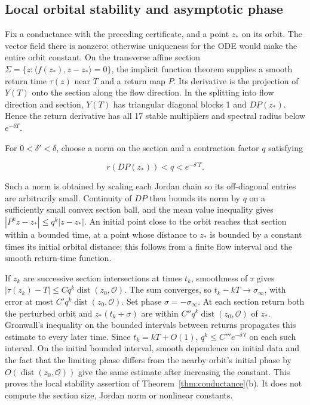 \documentclass[11pt]{article}
\theoremstyle{definition}
\begin{document}
\subsection{Local orbital stability and asymptotic phase}\label{sec:cg-10}

Fix a conductance with the preceding certificate, and a point $z_*$ on its orbit. The vector field there is nonzero: otherwise uniqueness for the ODE would make the entire orbit constant. On the transverse affine section $\Sigma=\{z:\langle f(z_*),z-z_*\rangle=0\}$, the implicit function theorem supplies a smooth return time $\tau(z)$ near $T$ and a return map $P$. Its derivative is the projection of $Y(T)$ onto the section along the flow direction. In the splitting into flow direction and section, $Y(T)$ has triangular diagonal blocks 1 and $DP(z_*)$. Hence the return derivative has all 17 stable multipliers and spectral radius below $e^{-\delta T}$.

For $0<\delta'<\delta$, choose a norm on the section and a contraction factor $q$ satisfying

\[
 r(DP(z_*))<q<e^{-\delta'T}.
\]

Such a norm is obtained by scaling each Jordan chain so its off-diagonal entries are arbitrarily small. Continuity of $DP$ then bounds its norm by $q$ on a sufficiently small convex section ball, and the mean value inequality gives $|P^kz-z_*|\le q^k|z-z_*|$. An initial point close to the orbit reaches that section within a bounded time, at a point whose distance to $z_*$ is bounded by a constant times its initial orbital distance; this follows from a finite flow interval and the smooth return-time function.

If $z_k$ are successive section intersections at times $t_k$, smoothness of $\tau$ gives $|\tau(z_k)-T|\le Cq^k\operatorname{dist}(z_0,\mathcal O)$. The sum converges, so $t_k-kT\to\sigma_\infty$, with error at most $C'q^k\operatorname{dist}(z_0,\mathcal O)$. Set phase $\sigma=-\sigma_\infty$. At each section return both the perturbed orbit and $z_*(t_k+\sigma)$ are within $C''q^k\operatorname{dist}(z_0,\mathcal O)$ of $z_*$. Gronwall's inequality on the bounded intervals between returns propagates this estimate to every later time. Since $t_k=kT+O(1)$, $q^k\le C'''e^{-\delta't}$ on each such interval. On the initial bounded interval, smooth dependence on initial data and the fact that the limiting phase differs from the nearby orbit's initial phase by $O(\operatorname{dist}(z_0,\mathcal O))$ give the same estimate after increasing the constant. This proves the local stability assertion of Theorem~\ref{thm:conductance}(b). It does not compute the section size, Jordan norm or nonlinear constants.
\end{document}
